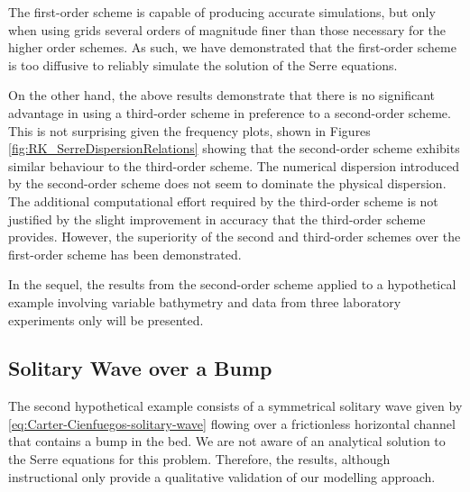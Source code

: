 \documentclass[preprint,sort&compress,1p]{article}
\begin{document}
The first-order scheme is capable of producing accurate simulations, but only when using grids several orders of magnitude finer than those necessary for the  higher order schemes. As such, we have demonstrated that the first-order scheme is too diffusive to reliably simulate the solution of the Serre equations.

On the other hand, the above results demonstrate that there is no significant advantage in using a third-order scheme in preference to a second-order scheme. This is not surprising given the frequency plots, shown in Figures \ref{fig:RK_SerreDispersionRelations} showing that the second-order scheme exhibits similar behaviour to the third-order scheme. The numerical dispersion introduced by the second-order scheme does not seem to dominate the physical dispersion. The additional computational effort required by the third-order scheme is not justified by the slight improvement in accuracy that the third-order scheme provides. However, the superiority of the second and third-order schemes over the first-order scheme has been demonstrated.

In the sequel, the results from the second-order scheme applied to a hypothetical example involving variable bathymetry and data from three laboratory experiments only will be presented.

\subsection{Solitary Wave  over a Bump}\label{Steady Flow over a Bump}

The second hypothetical example consists of a symmetrical solitary wave given by \eqref{eq:Carter-Cienfuegos-solitary-wave} flowing over a frictionless horizontal channel that contains a bump in the bed. We are not aware of an analytical solution to the Serre equations for this problem. Therefore, the results, although instructional only provide a qualitative validation of our modelling approach.
\end{document}
